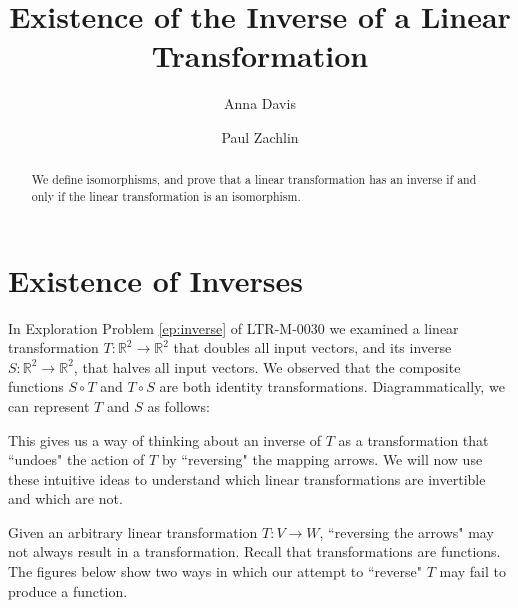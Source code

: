 \documentclass{ximera}
\author{Anna Davis \and Paul Zachlin} \title{Existence of the Inverse of a Linear Transformation} \license{CC-BY 4.0}
\renewcommand{\vec}[1]{{\bf #1}}
\newcommand{\RR}{\mathbb{R}}
\begin{document}
\begin{abstract}
  We define  isomorphisms, and prove that a linear transformation has an inverse if and only if the linear transformation is an isomorphism.
\end{abstract}
\maketitle



\section*{Existence of Inverses}

In Exploration Problem \ref{ep:inverse} of LTR-M-0030 we examined a linear transformation $T:\RR^2\rightarrow \RR^2$ that doubles all input vectors, and its inverse $S:\RR^2\rightarrow \RR^2$, that halves all input vectors.  We observed that the composite functions $S\circ T$ and $T\circ S$ are both identity transformations.  Diagrammatically, we can represent $T$ and $S$ as follows:
 \begin{center}
\end{center}

This gives us a way of thinking about an inverse of $T$ as a transformation that ``undoes" the action of $T$ by ``reversing" the mapping arrows.  We will now use these intuitive ideas to understand which linear transformations are invertible and which are not.

Given an arbitrary linear transformation $T:V\rightarrow W$, ``reversing the arrows"
 may not always result in a transformation. Recall that transformations are functions.  The figures below show two ways in which our attempt to ``reverse" $T$ may fail to produce a function.
 
\end{document}
